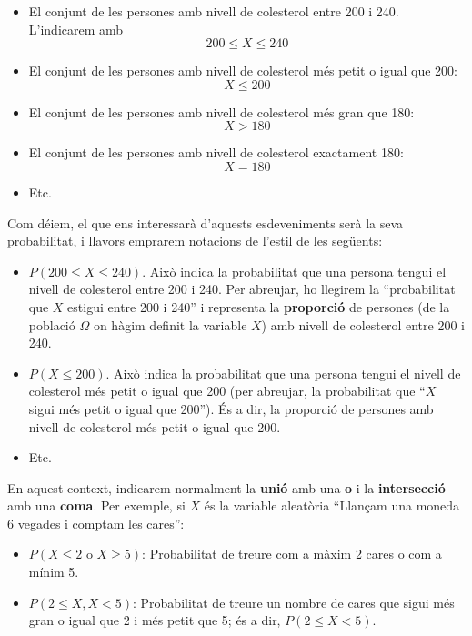 \documentclass[
]{book}
\renewcommand{\leq}{\leqslant}
\renewcommand{\geq}{\geqslant}
\theoremstyle{definition}
\theoremstyle{definition}
\theoremstyle{definition}
\theoremstyle{remark}
\begin{document}
\begin{itemize}
\item
  El conjunt de les persones amb nivell de colesterol entre 200 i 240. L'indicarem amb
  \[
  200\leq X\leq 240
  \]
\item
  El conjunt de les persones amb nivell de colesterol més petit o igual que 200:
  \[
  X\leq 200
  \]
\item
  El conjunt de les persones amb nivell de colesterol més gran que 180:
  \[
  X>180
  \]
\item
  El conjunt de les persones amb nivell de colesterol exactament 180:
  \[
  X=180
  \]
\item
  Etc.
\end{itemize}

Com déiem, el que ens interessarà d'aquests esdeveniments serà la seva probabilitat, i llavors emprarem notacions de l'estil de les següents:

\begin{itemize}
\item
  \(P(200\leq X\leq 240)\). Això indica la probabilitat que una persona tengui el nivell de colesterol entre 200 i 240. Per abreujar, ho llegirem la ``probabilitat que \(X\) estigui entre 200 i 240'' i representa la \textbf{proporció} de persones (de la població \(\Omega\) on hàgim definit la variable \(X\)) amb nivell de colesterol entre 200 i 240.
\item
  \(P(X\leq 200)\). Això indica la probabilitat que una persona tengui el nivell de colesterol més petit o igual que 200 (per abreujar, la probabilitat que ``\(X\) sigui més petit o igual que 200''). És a dir, la proporció de persones amb nivell de colesterol més petit o igual que 200.
\item
  Etc.
\end{itemize}

En aquest context, indicarem normalment la \textbf{unió} amb una \textbf{o} i la \textbf{intersecció} amb una \textbf{coma}. Per exemple, si \(X\) és la variable aleatòria ``Llançam una moneda 6 vegades i comptam les cares'':

\begin{itemize}
\item
  \(P(X\leq 2\text{ o }X\geq 5)\): Probabilitat de treure com a màxim 2 cares o com a mínim 5.
\item
  \(P(2\leq X, X< 5)\): Probabilitat de treure un nombre de cares que sigui més gran o igual que 2 i més petit que 5; és a dir, \(P(2\leq X< 5)\).
\end{itemize}
\end{document}
